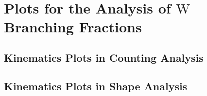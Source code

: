 
\chapter{Plots for the Analysis of $\mathrm{W}$ Branching Fractions}

\section{Kinematics Plots in Counting Analysis}

\FloatBarrier



\section{Kinematics Plots in Shape Analysis}

\FloatBarrier

\FloatBarrier

\FloatBarrier

\FloatBarrier

\FloatBarrier

\FloatBarrier

\FloatBarrier

